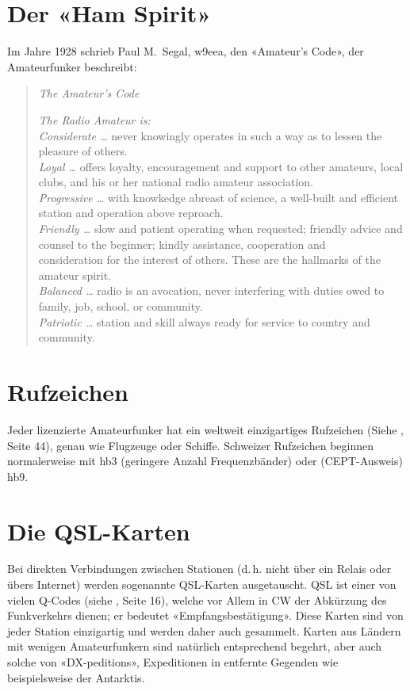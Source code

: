 \section{Der «Ham Spirit»}
Im Jahre 1928 schrieb Paul M.~Segal, w9eea, den «Amateur's Code», der Amateurfunker beschreibt:

\begin{quotation}
\textit{The Amateur's Code}

\vspace{1em}
\noindent
\textit{The Radio Amateur is:}\\
\textit{Considerate …} never knowingly operates in such a way as to lessen the pleasure of others. \\
\textit{Loyal …} offers loyalty, encouragement and support to other amateurs, local clubs, and his or her national radio amateur association. \\
\textit{Progressive …} with knowkedge abreast of science, a well-built and efficient station and operation above reproach. \\
\textit{Friendly …} slow and patient operating when requested; friendly advice and counsel to the beginner; kindly assistance, cooperation and \\ consideration for the interest of others. These are the hallmarks of the amateur spirit. \\
\textit{Balanced …} radio is an avocation, never interfering with duties owed to family, job, school, or community. \\
\textit{Patriotic …} station and skill always ready for service to country and community.
 
\end{quotation}


\section{Rufzeichen}
Jeder lizenzierte Amateurfunker hat ein weltweit einzigartiges Rufzeichen (Siehe , Seite 44), genau wie Flugzeuge oder Schiffe. Schweizer Rufzeichen beginnen normalerweise mit hb3 (geringere Anzahl Frequenzbänder) oder (CEPT-Ausweis) hb9.

\section{Die QSL-Karten}
Bei direkten Verbindungen zwischen Stationen (d.\,h. nicht über ein Relais oder übers Internet) werden sogenannte QSL-Karten ausgetauscht. QSL ist einer von vielen Q-Codes (siehe , Seite 16), welche vor Allem in CW der Abkürzung des Funkverkehrs dienen; er bedeutet «Empfangsbestätigung». Diese Karten sind von jeder Station einzigartig und werden daher auch gesammelt. Karten aus Ländern mit wenigen Amateurfunkern sind natürlich entsprechend begehrt, aber auch solche von «DX-peditions», Expeditionen in entfernte Gegenden wie beispielsweise der Antarktis. 

